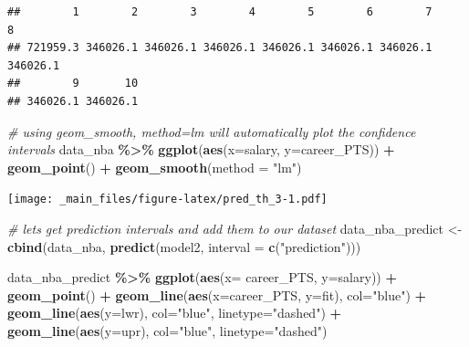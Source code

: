\documentclass[
]{book}
\newenvironment{Shaded}{\begin{snugshade}}{\end{snugshade}}
\newcommand{\AttributeTok}[1]{\textcolor[rgb]{0.13,0.29,0.53}{#1}}
\newcommand{\CommentTok}[1]{\textcolor[rgb]{0.56,0.35,0.01}{\textit{#1}}}
\newcommand{\FunctionTok}[1]{\textcolor[rgb]{0.13,0.29,0.53}{\textbf{#1}}}
\newcommand{\NormalTok}[1]{#1}
\newcommand{\OtherTok}[1]{\textcolor[rgb]{0.56,0.35,0.01}{#1}}
\newcommand{\SpecialCharTok}[1]{\textcolor[rgb]{0.81,0.36,0.00}{\textbf{#1}}}
\newcommand{\StringTok}[1]{\textcolor[rgb]{0.31,0.60,0.02}{#1}}
\begin{document}
\begin{verbatim}
##        1        2        3        4        5        6        7        8 
## 721959.3 346026.1 346026.1 346026.1 346026.1 346026.1 346026.1 346026.1 
##        9       10 
## 346026.1 346026.1
\end{verbatim}

\begin{Shaded}
\begin{Highlighting}[]
\CommentTok{\# using geom\_smooth, method=lm will automatically plot the confidence intervals}
\NormalTok{data\_nba }\SpecialCharTok{\%\textgreater{}\%}
  \FunctionTok{ggplot}\NormalTok{(}\FunctionTok{aes}\NormalTok{(}\AttributeTok{x=}\NormalTok{salary, }\AttributeTok{y=}\NormalTok{career\_PTS)) }\SpecialCharTok{+}
  \FunctionTok{geom\_point}\NormalTok{() }\SpecialCharTok{+}
  \FunctionTok{geom\_smooth}\NormalTok{(}\AttributeTok{method =} \StringTok{"lm"}\NormalTok{)}
\end{Highlighting}
\end{Shaded}

\texttt{[image: \_main\_files/figure-latex/pred\_th\_3-1.pdf]}

\begin{Shaded}
\begin{Highlighting}[]
\CommentTok{\# let\textquotesingle{}s get prediction intervals and add them to our dataset}
\NormalTok{data\_nba\_predict }\OtherTok{\textless{}{-}} \FunctionTok{cbind}\NormalTok{(data\_nba, }\FunctionTok{predict}\NormalTok{(model2, }\AttributeTok{interval =} \FunctionTok{c}\NormalTok{(}\StringTok{"prediction"}\NormalTok{)))}

\NormalTok{data\_nba\_predict }\SpecialCharTok{\%\textgreater{}\%}
  \FunctionTok{ggplot}\NormalTok{(}\FunctionTok{aes}\NormalTok{(}\AttributeTok{x=}\NormalTok{ career\_PTS, }\AttributeTok{y=}\NormalTok{salary)) }\SpecialCharTok{+}
  \FunctionTok{geom\_point}\NormalTok{() }\SpecialCharTok{+}
  \FunctionTok{geom\_line}\NormalTok{(}\FunctionTok{aes}\NormalTok{(}\AttributeTok{x=}\NormalTok{career\_PTS, }\AttributeTok{y=}\NormalTok{fit),}
            \AttributeTok{col=}\StringTok{"blue"}\NormalTok{) }\SpecialCharTok{+}
  \FunctionTok{geom\_line}\NormalTok{(}\FunctionTok{aes}\NormalTok{(}\AttributeTok{y=}\NormalTok{lwr),}
                \AttributeTok{col=}\StringTok{"blue"}\NormalTok{,}
                \AttributeTok{linetype=}\StringTok{"dashed"}\NormalTok{) }\SpecialCharTok{+}
  \FunctionTok{geom\_line}\NormalTok{(}\FunctionTok{aes}\NormalTok{(}\AttributeTok{y=}\NormalTok{upr),}
                \AttributeTok{col=}\StringTok{"blue"}\NormalTok{,}
                \AttributeTok{linetype=}\StringTok{"dashed"}\NormalTok{)}
\end{Highlighting}
\end{Shaded}
\end{document}
